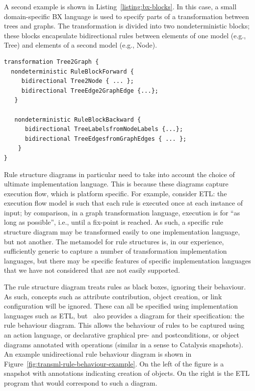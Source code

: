 A second example is shown in Listing~\ref{listing:bx-blocks}. In this case, a small domain-specific BX language is used to specify parts of a transformation between trees and graphs. The transformation is divided into two nondeterministic blocks; these blocks encapsulate bidirectional rules between elements of one model (e.g., Tree) and elements of a second model (e.g., Node). 

\begin{lstlisting}[float,floatplacement=H,basicstyle=\ttfamily,caption=An example of a BX using blocks, captionpos=b, label=listing:bx-blocks]
transformation Tree2Graph {
  nondeterministic RuleBlockForward {
     bidirectional Tree2Node { ... };
     bidirectional TreeEdge2GraphEdge {...};
   }
   
   nondeterministic RuleBlockBackward {
      bidirectional TreeLabelsfromNodeLabels {...};
      bidirectional TreeEdgesfromGraphEdges { ... };
    }
}
\end{lstlisting}
Rule structure diagrams in particular need to take into account the choice of ultimate implementation language. This is because these diagrams capture execution flow, which is platform specific. For example, consider ETL: the execution flow model is such that each rule is executed once at each instance of input; by comparison, in a graph transformation language, execution is for ``as long as possible'', i.e., until a fix-point is reached. As such, a specific rule structure diagram may be transformed easily to one implementation language, but not another. The metamodel for rule structures is, in our experience, sufficiently generic to capture a number of transformation implementation languages, but there may be specific features of specific implementation languages that we have not considered that are not easily supported.

The rule structure diagram treats rules as black boxes, ignoring their behaviour. As such, concepts such as attribute contribution, object creation, or link configuration will be ignored. These can all be specified using implementation languages such as ETL, but \transml\ also provides a diagram for their specification: the rule behaviour diagram. This allows the behaviour of rules to be captured using an action language, or declarative graphical pre- and postconditions, or object diagrams annotated with operations (similar in a sense to Catalysis snapshots). An example unidirectional rule behaviour diagram is shown in Figure~\ref{fig:transml-rule-behaviour-example}. On the left of the figure is a snapshot with annotations indicating creation of objects. On the right is the ETL program that would correspond to such a diagram.

